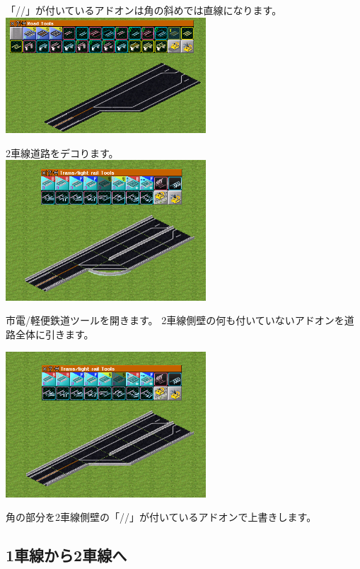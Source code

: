 \documentclass{jbook}
\begin{document}
\begin{multicols}{2}
「//」が付いているアドオンは角の斜めでは直線になります。\\

\includegraphics[width = 75mm]{picture/20210214-road-3-4.png}

2車線道路をデコります。\\

\includegraphics[width = 75mm]{picture/20210214-road-3-5.png}

市電/軽便鉄道ツールを開きます。
2車線側壁の何も付いていないアドオンを道路全体に引きます。

\includegraphics[width = 75mm]{picture/20210214-road-3-6.png}

角の部分を2車線側壁の「//」が付いているアドオンで上書きします。

\end{multicols}

\newpage


\subsection{1車線から2車線へ}
\label{sub:1lane_to_2lane}
\end{document}
